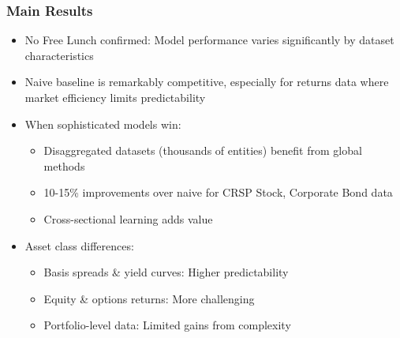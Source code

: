 \documentclass[ignorenonframetext, 9pt]{beamer}
\begin{document}
\begin{frame}
  \frametitle{Main Results}
  \begin{itemize}
  \item \alert{No Free Lunch confirmed:} Model performance varies significantly by dataset characteristics
  \vspace{0.3cm}
  \item \alert{Naive baseline is remarkably competitive}, especially for returns data where market efficiency limits predictability
  \vspace{0.3cm}
  \item \alert{When sophisticated models win:}
  \begin{itemize}
    \item Disaggregated datasets (thousands of entities) benefit from global methods
    \item 10-15\% improvements over naive for CRSP Stock, Corporate Bond data
    \item Cross-sectional learning adds value
  \end{itemize}
  \vspace{0.3cm}
  \item \alert{Asset class differences:}
  \begin{itemize}
    \item Basis spreads \& yield curves: Higher predictability
    \item Equity \& options returns: More challenging
    \item Portfolio-level data: Limited gains from complexity
  \end{itemize}
  \end{itemize}
\end{frame}
\end{document}
